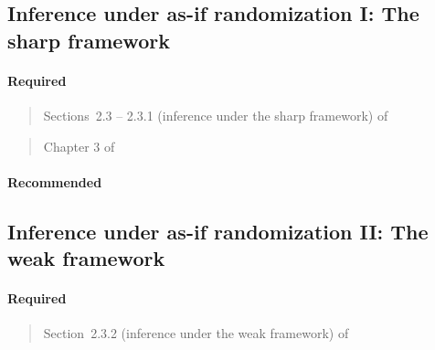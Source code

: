 \documentclass[12pt]{article}
\begin{document}
\begin{verse}  \end{verse}

\begin{verse}  \end{verse}

\begin{verse}  \end{verse}

\begin{verse}  \end{verse}

\subsection{Inference under as-if randomization I: The sharp framework}

\paragraph*{Required}

\begin{verse} Sections~2.3 -- 2.3.1 (inference under the sharp framework) of  \end{verse}

\begin{verse} Chapter 3 of  \end{verse}

\paragraph*{Recommended}

\begin{verse}  \end{verse}

\subsection{Inference under as-if randomization II: The weak framework}

\paragraph*{Required}

\begin{verse} Section~2.3.2 (inference under the weak framework) of  \end{verse}
\end{document}
